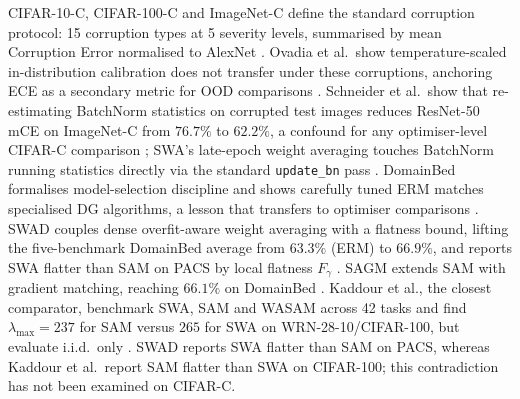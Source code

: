 CIFAR-10-C, CIFAR-100-C and ImageNet-C define the standard corruption protocol: 15 corruption types at 5 severity levels, summarised by mean Corruption Error normalised to AlexNet \cite{hendrycks2019_benchmarking_neural}.
Ovadia et al.\ show temperature-scaled in-distribution calibration does not transfer under these corruptions, anchoring ECE as a secondary metric for OOD comparisons \cite{ovadia2019_can_you}.
Schneider et al.\ show that re-estimating BatchNorm statistics on corrupted test images reduces ResNet-50 mCE on ImageNet-C from $76.7\%$ to $62.2\%$, a confound for any optimiser-level CIFAR-C comparison \cite{schneider2020_improving_robustness}; SWA's late-epoch weight averaging touches BatchNorm running statistics directly via the standard \texttt{update\_bn} pass \cite{izmailov2018_averaging_weights}.
DomainBed formalises model-selection discipline and shows carefully tuned ERM matches specialised DG algorithms, a lesson that transfers to optimiser comparisons \cite{gulrajani2020_search_lost}.
SWAD couples dense overfit-aware weight averaging with a flatness bound, lifting the five-benchmark DomainBed average from $63.3\%$ (ERM) to $66.9\%$, and reports SWA flatter than SAM on PACS by local flatness $F_\gamma$ \cite{cha2021_swad_domain}.
SAGM extends SAM with gradient matching, reaching $66.1\%$ on DomainBed \cite{wang2023_sharpness_aware}.
Kaddour et al., the closest comparator, benchmark SWA, SAM and WASAM across 42 tasks and find $\lambda_{\max}=237$ for SAM versus $265$ for SWA on WRN-28-10/CIFAR-100, but evaluate i.i.d.\ only \cite{kaddour2022_when_do}.
SWAD reports SWA flatter than SAM on PACS, whereas Kaddour et al.\ report SAM flatter than SWA on CIFAR-100; this contradiction has not been examined on CIFAR-C.

